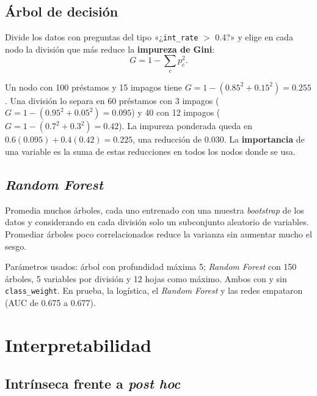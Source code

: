 \documentclass[11pt,a4paper]{article}
\newcommand{\code}[1]{\texttt{#1}}
\begin{document}
\subsection{Árbol de decisión}

Divide los datos con preguntas del tipo «¿\code{int\_rate} $>$ 0.4?» y elige en cada nodo la división que más reduce la \textbf{impureza de Gini}:
\begin{equation}
G = 1 - \sum_c p_c^2 .
\end{equation}

\begin{ejemplo}
Un nodo con 100 préstamos y 15 impagos tiene $G=1-(0.85^2+0.15^2)=0.255$. Una división lo separa en 60 préstamos con 3 impagos ($G=1-(0.95^2+0.05^2)=0.095$) y 40 con 12 impagos ($G=1-(0.7^2+0.3^2)=0.42$). La impureza ponderada queda en $0.6(0.095)+0.4(0.42)=0.225$, una reducción de $0.030$. La \textbf{importancia} de una variable es la suma de estas reducciones en todos los nodos donde se usa.
\end{ejemplo}

\subsection{\textit{Random Forest}}

Promedia muchos árboles, cada uno entrenado con una muestra \textit{bootstrap} de los datos y considerando en cada división solo un subconjunto aleatorio de variables. Promediar árboles poco correlacionados reduce la varianza sin aumentar mucho el sesgo.

\begin{proyecto}
Parámetros usados: árbol con profundidad máxima 5; \textit{Random Forest} con 150 árboles, 5 variables por división y 12 hojas como máximo. Ambos con y sin \code{class\_weight}. En prueba, la logística, el \textit{Random Forest} y las redes empataron (AUC de 0.675 a 0.677).
\end{proyecto}

\section{Interpretabilidad}

\subsection{Intrínseca frente a \textit{post hoc}}
\end{document}
